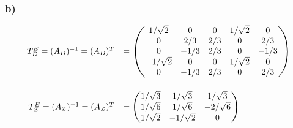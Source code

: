\documentclass[main.tex]{subfiles}
\begin{document}
\subsubsection{b)}
\begin{align*}
    \begin{array}{rl}
        T^E_D = (A_D)^{-1} = (A_D)^T & = \begin{pmatrix}
            1/\sqrt{2} & 0 & 0 & 1/\sqrt{2} & 0\\
            0 & 2/3 & 2/3 & 0 & 2/3\\
            0 & -1/3 & 2/3 & 0 & -1/3\\
            -1/\sqrt{2} & 0 & 0 & 1/\sqrt{2} & 0\\
            0 & -1/3 & 2/3 & 0 & 2/3\\
        \end{pmatrix}\\[1.4cm]
        T^E_Z = (A_Z)^{-1} = (A_Z)^T & = \begin{pmatrix}
            1/\sqrt{3} & 1/\sqrt{3} & 1/\sqrt{3}\\
            1/\sqrt{6} & 1/\sqrt{6} & -2/\sqrt{6}\\
            1/\sqrt{2} & -1/\sqrt{2} & 0
        \end{pmatrix}
    \end{array}
\end{align*}
\end{document}
